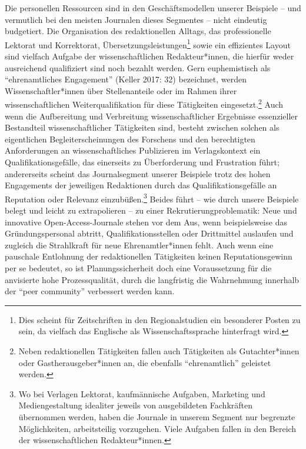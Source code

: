 \documentclass[a4paper,
fontsize=11pt,
oneside,
numbers=noperiodatend,
parskip=half-,
bibliography=totoc,
final
]{scrartcl}
\begin{document}
Die personellen Ressourcen sind in den Geschäftsmodellen unserer
Beispiele -- und vermutlich bei den meisten Journalen dieses Segmentes
-- nicht eindeutig budgetiert. Die Organisation des redaktionellen
Alltags, das professionelle Lektorat und Korrektorat,
Übersetzungsleistungen\footnote{Dies scheint für Zeitschriften in den
  Regionalstudien ein besonderer Posten zu sein, da vielfach das
  Englische als Wissenschaftssprache hinterfragt wird.} sowie ein
effizientes Layout sind vielfach Aufgabe der wissenschaftlichen
Redakteur*innen, die hierfür weder ausreichend qualifiziert sind noch
bezahlt werden. Gern euphemistisch als \enquote{ehrenamtliches
Engagement} (Keller 2017: 32) bezeichnet, werden Wissenschaftler*innen
über Stellenanteile oder im Rahmen ihrer wissenschaftlichen
Weiterqualifikation für diese Tätigkeiten eingesetzt.\footnote{Neben
  redaktionellen Tätigkeiten fallen auch Tätigkeiten als Gutachter*innen
  oder Gastherausgeber*innen an, die ebenfalls \enquote{ehrenamtlich}
  geleistet werden.} Auch wenn die Aufbereitung und Verbreitung
wissenschaftlicher Ergebnisse essenzieller Bestandteil
wissenschaftlicher Tätigkeiten sind, besteht zwischen solchen als
eigentlichen Begleiterscheinungen des Forschens und den berechtigten
Anforderungen an wissenschaftliches Publizieren im Verlagskontext ein
Qualifikationsgefälle, das einerseits zu Überforderung und Frustration
führt; andererseits scheint das Journalsegment unserer Beispiele trotz
des hohen Engagements der jeweiligen Redaktionen durch das
Qualifikationsgefälle an Reputation oder Relevanz einzubüßen.\footnote{Wo
  bei Verlagen Lektorat, kaufmännische Aufgaben, Marketing und
  Mediengestaltung idealiter jeweils von ausgebildeten Fachkräften
  übernommen werden, haben die Journale in unserem Segment nur begrenzte
  Möglichkeiten, arbeitsteilig vorzugehen. Viele Aufgaben fallen in den
  Bereich der wissenschaftlichen Redakteur*innen.} Beides führt -- wie
durch unsere Beispiele belegt und leicht zu extrapolieren -- zu einer
Rekrutierungproblematik: Neue und innovative Open-Access-Journale stehen
vor dem Aus, wenn beispielsweise das Gründungspersonal abtritt,
Qualifikationsstellen oder Drittmittel auslaufen und zugleich die
Strahlkraft für neue Ehrenamtler*innen fehlt. Auch wenn eine pauschale
Entlohnung der redaktionellen Tätigkeiten keinen Reputationsgewinn per
se bedeutet, so ist Planungssicherheit doch eine Voraussetzung für die
anvisierte hohe Prozessqualität, durch die langfristig die Wahrnehmung
innerhalb der \enquote{peer community} verbessert werden kann.
\end{document}
